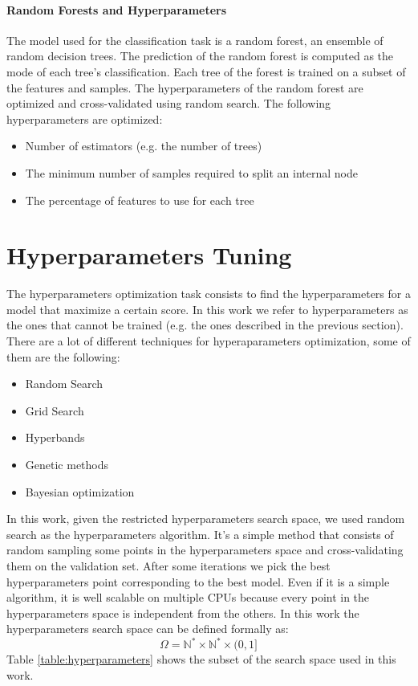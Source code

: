 \documentclass[11pt, a4paper]{article}
\begin{document}
\begin{multicols}{2}
  \paragraph{Random Forests and Hyperparameters}
    The model used for the classification task is a random forest, an ensemble of random decision trees. The prediction of the random forest is computed as the mode of each tree's classification. Each tree of the forest is trained on a subset of the features and samples.
    The hyperparameters of the random forest are optimized and cross-validated using random search. The following hyperparameters are optimized:
    \begin{itemize}
      \item Number of estimators (e.g. the number of trees)
      \item The minimum number of samples required to split an internal node
      \item The percentage of features to use for each tree
    \end{itemize}

\section{Hyperparameters Tuning}
  The hyperparameters optimization task consists to find the hyperparameters for a model that maximize a certain score. In this work we refer to hyperparameters as the ones that cannot be trained (e.g. the ones described in the previous section).
  There are a lot of different techniques for hyperaparameters optimization, some of them are the following:
  \begin{itemize}
    \item Random Search
    \item Grid Search
    \item Hyperbands
    \item Genetic methods
    \item Bayesian optimization
  \end{itemize}
  In this work, given the restricted hyperparameters search space, we used random search as the hyperparameters algorithm. It's a simple method that consists of random sampling some points in the hyperparameters space and cross-validating them on the validation set. After some iterations we pick the best hyperparameters point corresponding to the best model.
  Even if it is a simple algorithm, it is well scalable on multiple CPUs because every point in the hyperparameters space is independent from the others.
  In this work the hyperparameters search space can be defined formally as:
  \[\Omega=\mathbb{N}^{*}\times\mathbb{N}^{*}\times(0,1]\]
  Table \ref{table:hyperparameters} shows the subset of the search space used in this work.
  

\end{multicols}
\end{document}
